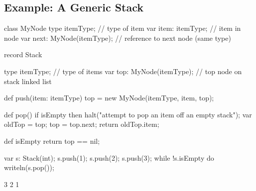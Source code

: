 \subsection{Example: A Generic Stack}
\label{Example_Generic_Stack}
\begin{chapelpre}
\end{chapelpre}
\begin{chapel}
class MyNode {
  type itemType;              // type of item
  var item: itemType;         // item in node
  var next: MyNode(itemType); // reference to next node (same type)
}

record Stack {
  type itemType;             // type of items
  var top: MyNode(itemType); // top node on stack linked list

  def push(item: itemType) {
    top = new MyNode(itemType, item, top);
  }

  def pop() {
    if isEmpty then
      halt("attempt to pop an item off an empty stack");
    var oldTop = top;
    top = top.next;
    return oldTop.item;
  }

  def isEmpty return top == nil;
}
\end{chapel}
\begin{chapelpost}
var s: Stack(int);
s.push(1);
s.push(2);
s.push(3);
while !s.isEmpty do
  writeln(s.pop());
\end{chapelpost}
\begin{chapeloutput}
3
2
1
\end{chapeloutput}
